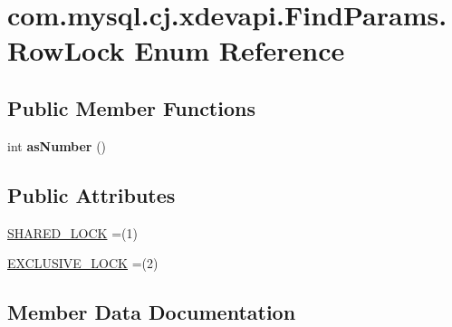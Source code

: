 \hypertarget{enumcom_1_1mysql_1_1cj_1_1xdevapi_1_1_find_params_1_1_row_lock}{}\section{com.\+mysql.\+cj.\+xdevapi.\+Find\+Params.\+Row\+Lock Enum Reference}
\label{enumcom_1_1mysql_1_1cj_1_1xdevapi_1_1_find_params_1_1_row_lock}
\subsection*{Public Member Functions}
\begin{DoxyCompactItemize}
\item 
\mbox{\label{enumcom_1_1mysql_1_1cj_1_1xdevapi_1_1_find_params_1_1_row_lock_a57a87f452853827c81efc7860be4f7e6}} 
int {\bfseries as\+Number} ()
\end{DoxyCompactItemize}
\subsection*{Public Attributes}
\begin{DoxyCompactItemize}
\item 
\mbox{\hyperlink{enumcom_1_1mysql_1_1cj_1_1xdevapi_1_1_find_params_1_1_row_lock_a56bd068879b1d9dda39f4b1a082cb022}{S\+H\+A\+R\+E\+D\+\_\+\+L\+O\+CK}} =(1)
\item 
\mbox{\hyperlink{enumcom_1_1mysql_1_1cj_1_1xdevapi_1_1_find_params_1_1_row_lock_acef98c8e1183e4ff2af9bff73f5d400c}{E\+X\+C\+L\+U\+S\+I\+V\+E\+\_\+\+L\+O\+CK}} =(2)
\end{DoxyCompactItemize}


\subsection{Member Data Documentation}
\mbox{\label{enumcom_1_1mysql_1_1cj_1_1xdevapi_1_1_find_params_1_1_row_lock_acef98c8e1183e4ff2af9bff73f5d400c}} 
